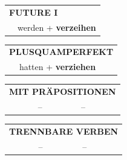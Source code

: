 \documentclass[10pt,a4paper]{revtex4-2}
\begin{document}
\begin{verbbox-dat}
\begin{tabular}{rl}
    \multicolumn{2}{l}{\textbf{FUTURE I} }\\
   & werden + \textbf{verzeihen}\\
 
  \end{tabular}
\hfill
   \begin{tabular}{rl}
      \multicolumn{2}{l}{\textbf{PLUSQUAMPERFEKT}}\\
   & hatten + \textbf{verziehen}\\
  \end{tabular}

   \vspace{10pt}

   \begin{tabular}{lll}
      \multicolumn{3}{l}{\textbf{MIT PRÄPOSITIONEN}}\\
 & -- & --\\
\end{tabular}
  \hfill
   \begin{tabular}{lll}
      \multicolumn{3}{l}{\textbf{TRENNBARE VERBEN}}\\
 & -- & --\\
  \end{tabular}


  \vspace{-5pt}


\end{verbbox-dat}
\end{document}
